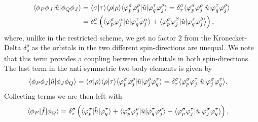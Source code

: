             \begin{align}
                \langle \phi_P\phi_J |
                \hat{u}
                | \phi_Q\phi_J \rangle
                &=
                \langle \sigma | \tau \rangle
                \langle \rho | \rho \rangle
                \langle \varphi^{\sigma}_{p}\varphi^{\rho}_{j} |
                \hat{u}
                | \varphi^{\tau}_{q}\varphi^{\rho}_{j} \rangle
                =
                \delta^{\sigma}_{\tau}
                \langle \varphi^{\sigma}_{p}\varphi^{\rho}_{j} |
                \hat{u}
                | \varphi^{\tau}_{q}\varphi^{\rho}_{j} \rangle
                \\
                &=
                \delta^{\sigma}_{\tau}
                \left( 
                    \langle \varphi^{\sigma}_{p}\varphi^{\alpha}_{j} |
                    \hat{u}
                    | \varphi^{\tau}_{q}\varphi^{\alpha}_{j} \rangle
                    +
                    \langle \varphi^{\sigma}_{p}\varphi^{\beta}_{j} |
                    \hat{u}
                    | \varphi^{\tau}_{q}\varphi^{\beta}_{j} \rangle
                 \right),
            \end{align}
            where, unlike in the restricted scheme, we get no factor $2$ from
            the Kronecker-Delta $\delta^{\rho}_{\rho}$ as the orbitals in the two
            different spin-directions are unequal.
            We note that this term provides a coupling between the orbitals in
            both spin-directions.
            The last term in the anti-symmetric two-body elements is given by
            \begin{align}
                \langle \phi_P\phi_J |
                \hat{u}
                | \phi_J\phi_Q \rangle
                &=
                \langle \sigma | \rho \rangle
                \langle \rho | \tau \rangle
                \langle \varphi^{\sigma}_{p}\varphi^{\rho}_{j} |
                \hat{u}
                | \varphi^{\rho}_{j}\varphi^{\tau}_{q} \rangle
                =
                \delta^{\sigma}_{\tau}
                \langle \varphi^{\sigma}_{p}\varphi^{\tau}_{j} |
                \hat{u}
                | \varphi^{\sigma}_{j}\varphi^{\tau}_{q} \rangle.
            \end{align}
            Collecting terms we are then left with
            \begin{align}
                \langle \phi_P |\hat{f}| \phi_Q \rangle
                &=
                \delta^{\sigma}_{\tau}
                \left( 
                    \langle \varphi^{\sigma}_{p} |
                    \hat{h}
                    | \varphi^{\tau}_{q} \rangle
                    +
                    \langle \varphi^{\sigma}_{p}\varphi^{\rho}_{j} |
                    \hat{u}
                    | \varphi^{\tau}_{q}\varphi^{\rho}_{j} \rangle
                    -
                    \langle \varphi^{\sigma}_{p}\varphi^{\tau}_{j} |
                    \hat{u}
                    | \varphi^{\sigma}_{j}\varphi^{\tau}_{q} \rangle
                 \right),
            \end{align}
